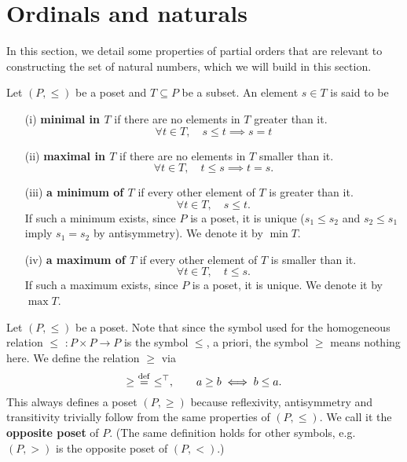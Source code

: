 \section{Ordinals and naturals} \label{ordinals-and-naturals}

In this section, we detail some properties of partial orders that are relevant to constructing the set of natural numbers, which we will build in this section.
\\

\begin{definition} \label{min-max-defs}
    Let $(P,\le)$ be a poset and $T \subseteq P$ be a subset. An element $s \in T$ is said to be
    \\

    \begin{itemize}
        \item[(i)] \textbf{minimal in $T$} if there are no elements in $T$ greater than it.
        \[
            \forall t \in T, \quad s \le t \implies s = t
        \]

        \item[(ii)] \textbf{maximal in $T$} if there are no elements in $T$ smaller than it.
        \[
            \forall t \in T, \quad t \le s \implies t = s.    
        \]

        \item[(iii)] \textbf{a minimum of $T$} if every other element of $T$ is greater than it. 
        \[
            \forall t \in T, \quad s \le t.
        \]
        If such a minimum exists, since $P$ is a poset, it is unique ($s_1 \le s_2$ and $s_2 \le s_1$ imply $s_1 = s_2$ by antisymmetry). We denote it by $\min T$. 
        \\

        \item[(iv)] \textbf{a maximum of $T$} if every other element of $T$ is smaller than it. 
        \[
            \forall t \in T, \quad t \le s.    
        \]
        If such a maximum exists, since $P$ is a poset, it is unique. We denote it by $\max T$.
        \\

    \end{itemize}
\end{definition}

\begin{example} \label{opposite-poset}
    Let $(P,\le)$ be a poset. Note that since the symbol used for the homogeneous relation $\le \,\, : P \times P \to P$ is the symbol $\le$, a priori, the symbol $\ge$ means nothing here. We define the relation $\ge$ via
    \[
        \ge \,\, \overset{\mathrm{def}}{=} \,\, \le^{\top}, \qquad a \ge b \iff b \le a.     
    \]
    This always defines a poset $(P, \ge)$ because reflexivity, antisymmetry and transitivity trivially follow from the same properties of $(P,\le)$. We call it the \textbf{opposite poset} of $P$. (The same definition holds for other symbols, e.g. $(P,>)$ is the opposite poset of $(P, <)$.)
\end{example}

